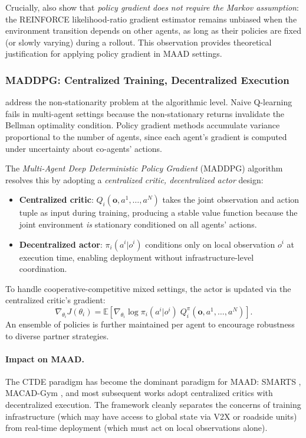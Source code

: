 \documentclass[12pt, a4paper]{article}
\begin{document}
Crucially, \citet{shalev2016safe} also show that \emph{policy gradient does not
require the Markov assumption}: the REINFORCE likelihood-ratio gradient estimator
remains unbiased when the environment transition depends on other agents, as long
as their policies are fixed (or slowly varying) during a rollout. This observation
provides theoretical justification for applying policy gradient in MAAD settings.

\subsubsection{MADDPG: Centralized Training, Decentralized Execution}
\label{sec:maddpg}

\citet{lowe2017multi} address the non-stationarity problem at the algorithmic level.
Naive Q-learning fails in multi-agent settings because the non-stationary returns
invalidate the Bellman optimality condition. Policy gradient methods accumulate
variance proportional to the number of agents, since each agent's gradient is
computed under uncertainty about co-agents' actions.

The \emph{Multi-Agent Deep Deterministic Policy Gradient} (MADDPG) algorithm
resolves this by adopting a \emph{centralized critic, decentralized actor} design:
\begin{itemize}[noitemsep]
  \item \textbf{Centralized critic}: $Q_i(\mathbf{o}, a^1, \dots, a^N)$ takes the
        joint observation and action tuple as input during training, producing a
        stable value function because the joint environment \emph{is} stationary
        conditioned on all agents' actions.
  \item \textbf{Decentralized actor}: $\pi_i(a^i | o^i)$ conditions only on local
        observation $o^i$ at execution time, enabling deployment without
        infrastructure-level coordination.
\end{itemize}
To handle cooperative-competitive mixed settings, the actor is updated via the
centralized critic's gradient:
\begin{equation}
  \nabla_{\theta_i} J(\theta_i)
  = \mathbb{E}\!\left[
      \nabla_{\theta_i} \log \pi_i(a^i|o^i)\;
      Q_i^\pi(\mathbf{o}, a^1, \dots, a^N)
    \right].
  \label{eq:maddpg}
\end{equation}
An ensemble of policies is further maintained per agent to encourage robustness to
diverse partner strategies.

\paragraph{Impact on MAAD.}
The CTDE paradigm has become the dominant paradigm for MAAD: SMARTS
\citep{zhou2020smarts}, MACAD-Gym \citep{palanisamy2020multi}, and most subsequent
works adopt centralized critics with decentralized execution. The framework cleanly
separates the concerns of training infrastructure (which may have access to global
state via V2X or roadside units) from real-time deployment (which must act on local
observations alone).
\end{document}
